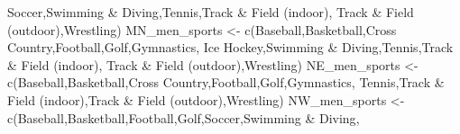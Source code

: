\documentclass[
]{article}
\newenvironment{Shaded}{\begin{snugshade}}{\end{snugshade}}
\newcommand{\FunctionTok}[1]{\textcolor[rgb]{0.00,0.00,0.00}{#1}}
\newcommand{\NormalTok}[1]{#1}
\newcommand{\OtherTok}[1]{\textcolor[rgb]{0.56,0.35,0.01}{#1}}
\newcommand{\StringTok}[1]{\textcolor[rgb]{0.31,0.60,0.02}{#1}}
\begin{document}
\begin{Shaded}
\begin{Highlighting}[]
                   \StringTok{\textquotesingle{}Soccer\textquotesingle{}}\NormalTok{,}\StringTok{\textquotesingle{}Swimming \& Diving\textquotesingle{}}\NormalTok{,}\StringTok{\textquotesingle{}Tennis\textquotesingle{}}\NormalTok{,}\StringTok{\textquotesingle{}Track \& Field (indoor)\textquotesingle{}}\NormalTok{,}
                   \StringTok{\textquotesingle{}Track \& Field (outdoor)\textquotesingle{}}\NormalTok{,}\StringTok{\textquotesingle{}Wrestling\textquotesingle{}}\NormalTok{)}
\NormalTok{MN\_men\_sports }\OtherTok{\textless{}{-}} \FunctionTok{c}\NormalTok{(}\StringTok{\textquotesingle{}Baseball\textquotesingle{}}\NormalTok{,}\StringTok{\textquotesingle{}Basketball\textquotesingle{}}\NormalTok{,}\StringTok{\textquotesingle{}Cross Country\textquotesingle{}}\NormalTok{,}\StringTok{\textquotesingle{}Football\textquotesingle{}}\NormalTok{,}\StringTok{\textquotesingle{}Golf\textquotesingle{}}\NormalTok{,}\StringTok{\textquotesingle{}Gymnastics\textquotesingle{}}\NormalTok{,}
                   \StringTok{\textquotesingle{}Ice Hockey\textquotesingle{}}\NormalTok{,}\StringTok{\textquotesingle{}Swimming \& Diving\textquotesingle{}}\NormalTok{,}\StringTok{\textquotesingle{}Tennis\textquotesingle{}}\NormalTok{,}\StringTok{\textquotesingle{}Track \& Field (indoor)\textquotesingle{}}\NormalTok{,}
                   \StringTok{\textquotesingle{}Track \& Field (outdoor)\textquotesingle{}}\NormalTok{,}\StringTok{\textquotesingle{}Wrestling\textquotesingle{}}\NormalTok{)}
\NormalTok{NE\_men\_sports }\OtherTok{\textless{}{-}} \FunctionTok{c}\NormalTok{(}\StringTok{\textquotesingle{}Baseball\textquotesingle{}}\NormalTok{,}\StringTok{\textquotesingle{}Basketball\textquotesingle{}}\NormalTok{,}\StringTok{\textquotesingle{}Cross Country\textquotesingle{}}\NormalTok{,}\StringTok{\textquotesingle{}Football\textquotesingle{}}\NormalTok{,}\StringTok{\textquotesingle{}Golf\textquotesingle{}}\NormalTok{,}\StringTok{\textquotesingle{}Gymnastics\textquotesingle{}}\NormalTok{,}
                   \StringTok{\textquotesingle{}Tennis\textquotesingle{}}\NormalTok{,}\StringTok{\textquotesingle{}Track \& Field (indoor)\textquotesingle{}}\NormalTok{,}\StringTok{\textquotesingle{}Track \& Field (outdoor)\textquotesingle{}}\NormalTok{,}\StringTok{\textquotesingle{}Wrestling\textquotesingle{}}\NormalTok{)}
\NormalTok{NW\_men\_sports }\OtherTok{\textless{}{-}} \FunctionTok{c}\NormalTok{(}\StringTok{\textquotesingle{}Baseball\textquotesingle{}}\NormalTok{,}\StringTok{\textquotesingle{}Basketball\textquotesingle{}}\NormalTok{,}\StringTok{\textquotesingle{}Football\textquotesingle{}}\NormalTok{,}\StringTok{\textquotesingle{}Golf\textquotesingle{}}\NormalTok{,}\StringTok{\textquotesingle{}Soccer\textquotesingle{}}\NormalTok{,}\StringTok{\textquotesingle{}Swimming \& Diving\textquotesingle{}}\NormalTok{,}

\end{Highlighting}
\end{Shaded}
\end{document}

